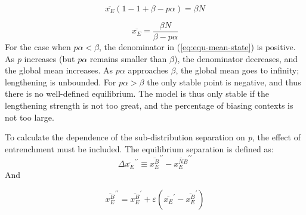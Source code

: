 \begin{equation}
\overline{x_{E}}(1-1+\beta-p\alpha)=\beta N
\end{equation}

\begin{equation}
\overline{x_{E}}=\frac{\beta N}{\beta-p\alpha}\label{eq:equ-mean-state}
\end{equation}
For the case when $p\alpha<\beta$, the denominator in (\ref{eq:equ-mean-state})
is positive. As \emph{p} increases (but $p\alpha$ remains smaller
than $\beta$), the denominator decreases, and the global mean increases.
As $p\alpha$ approaches $\beta$, the global mean goes to infinity;
lengthening is unbounded. For $p\alpha>\beta$ the only stable point
is negative, and thus there is no well-defined equilibrium. The 
model is thus only stable if the lengthening strength is not too great,
and the percentage of biasing contexts is not too large. 

To calculate the dependence of the sub-distribution separation on
\emph{p,} the effect of entrenchment must be included. The equilibrium
separation is defined as: 
\begin{equation}
\Delta\overline{x_{E}}^{\prime\prime}\equiv\overline{x_{E}^{B}}^{\prime\prime}-\overline{x_{E}^{NB}}^{\prime\prime}
\end{equation}
And 

\begin{equation}
\overline{x_{E}^{B}}^{\prime\prime}=\overline{x_{E}^{B}}^{\prime}+\varepsilon\left(\overline{x_{E}}^{\prime}-\overline{x_{E}^{B}}^{\prime}\right)
\end{equation}

